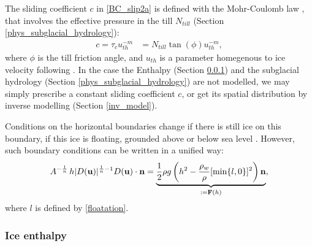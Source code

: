 \documentclass[10pt,twocolumn]{article}
\begin{document}
The sliding coefficient $c$ in \eqref{BC_slip2a} is defined with the Mohr-Coulomb law
\citep{Cuffey.2010}, that involves the effective pressure in the till $N_{till}$
(Section \ref{phys_subglacial_hydrology}):
\begin{align}
c  = \tau_c u_{th}^{-m} & = N_{till} \tan(\phi) u_{th}^{-m}, 
\label{sliding_param}
\end{align}
where $\phi$ is the till friction angle, and $u_{th}$ is a parameter homegenous to ice velocity
following \citet{pism-user-manual}.
In the case the Enthalpy (Section \ref{phys_enthalpy}) and the subglacial hydrology
(Section \ref{phys_subglacial_hydrology}) are not modelled, we may simply prescribe 
a constant sliding coefficient $c$, or get its spatial distribution by inverse modelling
(Section \ref{inv_model}).

Conditions on the horizontal boundaries change if there is still ice on this boundary, 
if this ice is floating, 
grounded above or below sea level \citep{Schoof2006a,Winkelmann2011}.
However, such boundary conditions can be written in a unified way:
\begin{equation}
 A^{-\frac{1}{n}}  \, h | D({\bf u}) |^{\frac{1}{n}-1} D({\bf u}) \cdot {\bf n} 
 =  \underbrace{\frac{1}{2}  \rho g 
 \left( h^2 - \frac{\rho_w}{\rho} [\min \{l,0 \}]^2 \right) {\bf n}}_{:= {\bf F}(h)},
\label{BC_SSA}
\end{equation} 
where $l$ is defined by \eqref{floatation}.
 
\subsubsection{Ice enthalpy}
\label{phys_enthalpy}
\end{document}
